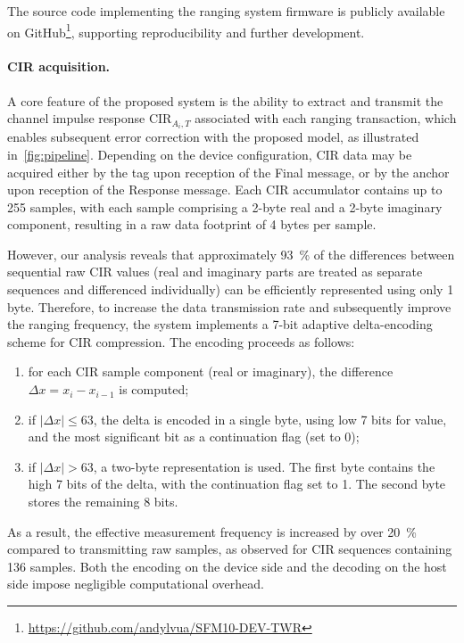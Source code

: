 The source code implementing the ranging system firmware is publicly available on GitHub\footnote{\url{https://github.com/andylvua/SFM10-DEV-TWR}}, supporting reproducibility and further development.

\paragraph{CIR acquisition.}

A core feature of the proposed system is the ability to extract and transmit the channel impulse response $\text{CIR}_{A_i,T}$ associated with each ranging transaction, which enables subsequent error correction with the proposed model, as illustrated in~\autoref{fig:pipeline}. Depending on the device configuration, CIR data may be acquired either by the tag upon reception of the Final message, or by the anchor upon reception of the Response message. Each CIR accumulator contains up to 255 samples, with each sample comprising a 2-byte real and a 2-byte imaginary component, resulting in a raw data footprint of 4 bytes per sample.

However, our analysis reveals that approximately \SI{93}{\percent} of the differences between sequential raw CIR values (real and imaginary parts are treated as separate sequences and differenced individually) can be efficiently represented using only 1 byte. Therefore, to increase the data transmission rate and subsequently improve the ranging frequency, the system implements a 7-bit adaptive delta-encoding scheme for CIR compression. The encoding proceeds as follows:

\begin{enumerate} 
    \item for each CIR sample component (real or imaginary), the difference $\Delta x = x_i - x_{i-1}$ is computed;
    \item if $|\Delta x| \leq 63$, the delta is encoded in a single byte, using low 7 bits for value, and the most significant bit as a continuation flag (set to 0);
    \item if $|\Delta x| > 63$, a two-byte representation is used. The first byte contains the high 7 bits of the delta, with the continuation flag set to 1. The second byte stores the remaining 8 bits. 
\end{enumerate} 
As a result, the effective measurement frequency is increased by over \SI{20}{\percent} compared to transmitting raw samples, as observed for CIR sequences containing 136 samples. Both the encoding on the device side and the decoding on the host side impose negligible computational overhead.

